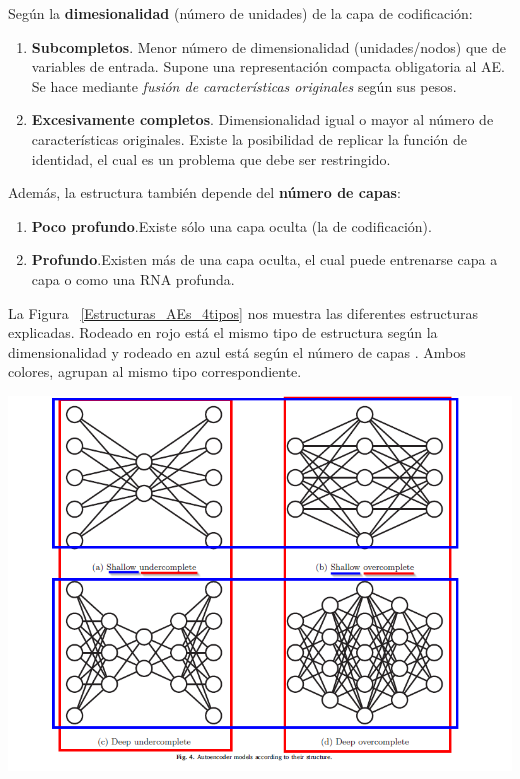 \begin{enumerate}
\begin{itemize}
        Según la \textbf{dimesionalidad} (número de unidades) de la capa de codificación:
            \begin{enumerate}
                \item \textbf{Subcompletos}. Menor número de dimensionalidad (unidades/nodos) que de variables de entrada. Supone una representación compacta obligatoria al AE. Se hace mediante \textit{fusión de características originales} según sus pesos.
                
                \item \textbf{Excesivamente completos}. Dimensionalidad igual o mayor al número de características originales. Existe la posibilidad de replicar la función de identidad, el cual es un problema que debe ser restringido.
            \end{enumerate}
            
        Además, la estructura también depende del \textbf{número de capas}:
            \begin{enumerate}
                \item \textbf{Poco profundo}.Existe sólo una capa oculta (la de codificación).
                
                \item \textbf{Profundo}.Existen más de una capa oculta, el cual puede entrenarse capa a capa o como una RNA profunda.
            \end{enumerate}
        
        \newpage
        La Figura ~\ref{Estructuras_AEs_4tipos} nos muestra las diferentes estructuras explicadas. Rodeado en \color{red}rojo \color{black} está el mismo tipo de estructura según la \color{red}dimensionalidad \color{black} y rodeado en \color{blue}azul \color{black} está según el \color{blue}número de capas \color{black}. Ambos colores, agrupan al mismo tipo correspondiente.
            
        \begin{center} \includegraphics[width=.8\textwidth]{imagenes/Estructuras_AEs_4tipos.png}
        \label{Estructuras_AEs_4tipos}
        \end{center}
        

\end{itemize}
\end{enumerate}
